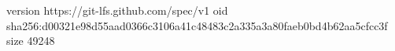 version https://git-lfs.github.com/spec/v1
oid sha256:d00321e98d55aad0366c3106a41c48483c2a335a3a80faeb0bd4b62aa5cfcc3f
size 49248
